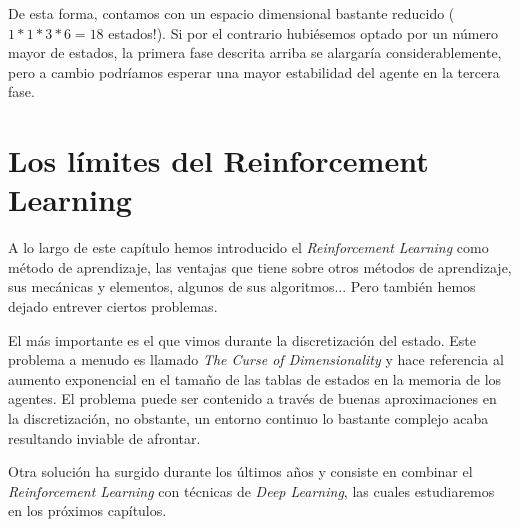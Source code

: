 De esta forma, contamos con un espacio dimensional bastante reducido ($1*1*3*6=18$ estados!). Si por el contrario hubiésemos optado por un número mayor de estados, la primera fase descrita arriba se alargaría considerablemente, pero a cambio podríamos esperar una mayor estabilidad del agente en la tercera fase.

\section{Los límites del Reinforcement Learning}
A lo largo de este capítulo hemos introducido el \textit{Reinforcement Learning} como método de aprendizaje, las ventajas que tiene sobre otros métodos de aprendizaje, sus mecánicas y elementos, algunos de sus algoritmos... Pero también hemos dejado entrever ciertos problemas.

El más importante es el que vimos durante la discretización del estado. Este problema a menudo es llamado \textit{The Curse of Dimensionality} y hace referencia al aumento exponencial en el tamaño de las tablas de estados en la memoria de los agentes. El problema puede ser contenido a través de buenas aproximaciones en la discretización, no obstante, un entorno continuo lo bastante complejo acaba resultando inviable de afrontar.

Otra solución ha surgido durante los últimos años y consiste en combinar el \textit{Reinforcement Learning} con técnicas de \textit{Deep Learning}, las cuales estudiaremos en los próximos capítulos.